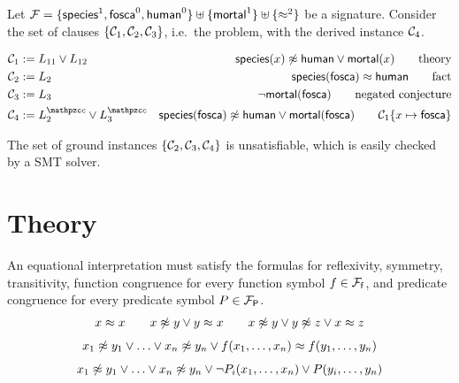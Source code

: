 \begin{example} Let ${\mathcal F} = \{\mathsf{species}^1, \mathsf{fosca}^0, \mathsf{human}^0 \} \uplus \{ \mathsf{mortal}^1  \} \uplus \{\approx^2\}$ be a signature. 
	Consider the set of clauses $\{ {\mathcal C}_1, {\mathcal C}_2, {\mathcal C}_3 \}$, i.e.~{\myem the problem}, with the derived instance ${\mathcal C}_4$.


\begin{align*}
\mcC_1 &:= L_{11}\lor L_{12}&\species(x)\mNE\human\lor\mortal(x) \tag*{theory}\\
\mcC_2 &:= L_2&\species(\fosca)\mEQ\human \tag*{fact} \\
\mcC_3 &:=L_3&\lnot\mortal(\fosca) \tag*{negated conjecture} \\
\mcC_4 &:=L_2^\mcc\lor L_3^\mcc&\species(\fosca)\mNE\human\lor\mortal(\fosca)\tag*{$\mcC_1 \{x\mapsto\fosca\}$}
\end{align*}

The set of ground instances $\{ {\mathcal C}_2, {\mathcal C}_3, {\mathcal C}_4  \}$ is unsatisfiable,
which is easily checked by a SMT solver.

\section{Theory}



	An equational interpretation must satisfy the formulas for reflexivity, symmetry, transitivity, 
	function congruence for every function symbol $f\in{{\mathcal F}_{\mathsf f}}$, 
	and predicate congruence for every predicate symbol $P\in{{\mathcal F}_{\mathsf P}}$.
	\[
		\begin{array}[t]{c}
		x\mEQ x 
\qquad
		x\mNE y\lor y\mEQ x
\qquad		
		x\mNE y\lor y\mNE z\lor x\mEQ z \\[0.7em]
%		
x_1 \mNE y_1\lor\ldots\lor x_n \mNE y_n\lor f(x_1,\ldots,x_n)\mEQ f(y_1,\ldots,y_n) \\[0.7em]
%
x_1\mNE y_1\lor\ldots\lor x_n\mNE y_n\lor\lnot P_i(x_1,\ldots,x_n)\lor P(y_i,\ldots,y_n)

		\end{array}
	\]







\end{example}

